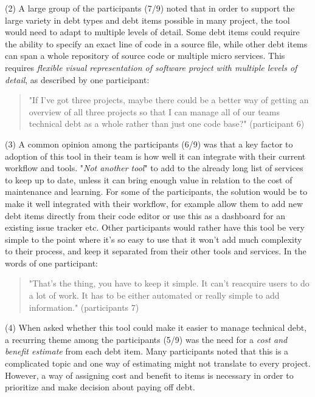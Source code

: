 (2) A large group of the participants (7/9) noted that in order to support the large variety in debt types and debt items possible in many project, the tool would need to adapt to multiple levels of detail.
Some debt items could require the ability to specify an exact line of code in a source file, while other debt items can span a whole repository of source code or multiple micro services.
This requires \textit{flexible visual representation of software project with multiple levels of detail}, as described by one participant:
\begin{quote}
  "If I've got three projects, maybe there could be a better way of getting an overview of all three projects so that I can manage all of our teams technical debt as a whole rather than just one code base?" (participant 6)
\end{quote}

(3) A common opinion among the participants (6/9) was that a key factor to adoption of this tool in their team is how well it can integrate with their current workflow and tools.
"\textit{Not another tool}" to add to the already long list of services to keep up to date, unless it can bring enough value in relation to the cost of maintenance and learning.
For some of the participants, the solution would be to make it well integrated with their workflow, for example allow them to add new debt items directly from their code editor or use this as a dashboard for an existing issue tracker etc.
Other participants would rather have this tool be very simple to the point where it's so easy to use that it won't add much complexity to their process, and keep it separated from their other tools and services. 
In the words of one participant:
\begin{quote}
  "That's the thing, you have to keep it simple. It can't reacquire users to do a lot of work. It has to be either automated or really simple to add information." (participants 7)
\end{quote}

(4) When asked whether this tool could make it easier to manage technical debt, a recurring theme among the participants (5/9) was the need for a \textit{cost and benefit estimate} from each debt item.
Many participants noted that this is a complicated topic and one way of estimating might not translate to every project.
However, a way of assigning cost and benefit to items is necessary in order to prioritize and make decision about paying off debt.